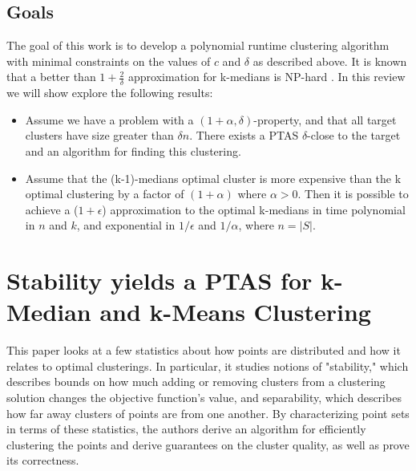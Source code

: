 \documentclass[paper=a4, fontsize=10.5pt]{scrartcl} %
\numberwithin{equation}{section} %
\numberwithin{figure}{section} %
\numberwithin{table}{section} %
\begin{document}
\subsection{Goals}

The goal of this work is to develop a polynomial runtime clustering algorithm with minimal constraints on the values of $c$ and $\delta$ as described above. It is known that a better than $1 + \frac{2}{\delta}$ approximation for k-medians is NP-hard \cite{thethingthepapercitesJMS02}. In this review we will show explore the following results:

\begin{itemize}

\item Assume we have a problem with a $(1+\alpha, \delta)$-property, and that all target clusters have size greater than $\delta n$. There exists a PTAS $\delta$-close to the target and an algorithm for finding this clustering.

\item Assume that the (k-1)-medians optimal cluster is more expensive than the k optimal clustering by a factor of $(1+\alpha)$ where $\alpha > 0$. Then it is possible to achieve a ($1+\epsilon$) approximation to the optimal k-medians in time polynomial in $n$ and $k$, and exponential in $1/\epsilon$ and $1/\alpha$, where $n = |S|$.

\end{itemize}


\section{Stability yields a PTAS for k-Median and k-Means Clustering}

This paper looks at a few statistics about how points are distributed and how it relates to optimal clusterings.  In particular, it studies notions of "stability," which describes bounds on how much adding or removing clusters from a clustering solution changes the objective function's value, and separability, which describes how far away clusters of points are from one another.  By characterizing point sets in terms of these statistics, the authors derive an algorithm for efficiently clustering the points and derive guarantees on the cluster quality, as well as prove its correctness.
\end{document}
